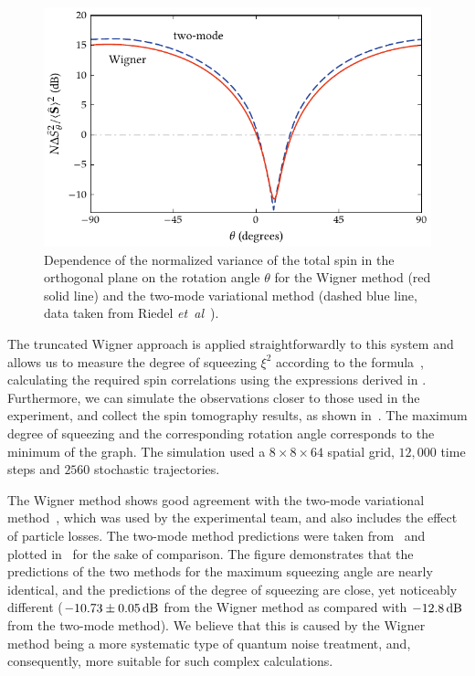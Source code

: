 \begin{figure}
    \centerline{\includegraphics{figures_generated/bec_squeezing/riedel_rotation.pdf}}

    \caption[Wigner simulated spin tomography in the component separation experiment]{
    Dependence of the normalized variance of the total spin in the orthogonal plane on the rotation angle $\theta$ for the Wigner method (red solid line) and the two-mode variational method (dashed blue line, data taken from Riedel \textit{et~al}~\cite{Riedel2010}).
    }%
    \label{fig:bec-squeezing:separation:tomography}
\end{figure}

The truncated Wigner approach is applied straightforwardly to this system and allows us to measure the degree of squeezing $\xi^2$ according to the formula~, calculating the required spin correlations using the expressions derived in .
Furthermore, we can simulate the observations closer to those used in the experiment, and collect the spin tomography results, as shown in~.
The maximum degree of squeezing and the corresponding rotation angle corresponds to the minimum of the graph.
The simulation used a $8\times8\times64$ spatial grid, $12,000$ time steps and $2560$ stochastic trajectories.

The Wigner method shows good agreement with the two-mode variational method~\cite{Li2009}, which was used by the experimental team, and also includes the effect of particle losses.
The two-mode method predictions were taken from~\cite{Riedel2010} and plotted in~ for the sake of comparison.
The figure demonstrates that the predictions of the two methods for the maximum squeezing angle are nearly identical, and the predictions of the degree of squeezing are close, yet noticeably different ($-10.73\pm0.05\mbox{\ensuremath{\,\mathrm{dB}}}$ from the Wigner method as compared with $-12.8\mbox{\ensuremath{\,\mathrm{dB}}}$ from the two-mode method).
We believe that this is caused by the Wigner method being a more systematic type of quantum noise treatment, and, consequently, more suitable for such complex calculations.


